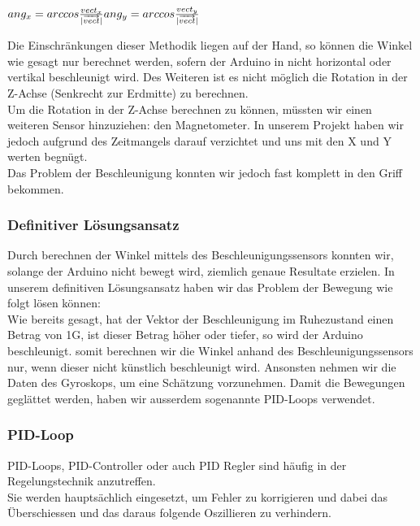 \vspace{5mm}
\begin{math}
ang_x = arccos{\frac{vect_x}{\lvert\overrightarrow{vect}\rvert}}\\
ang_y = arccos{\frac{vect_y}{\lvert\overrightarrow{vect}\rvert}}
\end{math}
\vspace{5mm}

Die Einschränkungen dieser Methodik liegen auf der Hand, so können die Winkel wie gesagt nur berechnet werden, sofern der Arduino in nicht horizontal oder vertikal beschleunigt wird.
Des Weiteren ist es nicht möglich die Rotation in der Z-Achse (Senkrecht zur Erdmitte) zu berechnen.\\
Um die Rotation in der Z-Achse berechnen zu können, müssten wir einen weiteren Sensor hinzuziehen: den Magnetometer. 
In unserem Projekt haben wir jedoch aufgrund des Zeitmangels darauf verzichtet und uns mit den X und Y werten begnügt.\\
Das Problem der Beschleunigung konnten wir jedoch fast komplett in den Griff bekommen.

\subsubsection{Definitiver Lösungsansatz}
Durch berechnen der Winkel mittels des Beschleunigungssensors konnten wir, solange der Arduino nicht bewegt wird, ziemlich genaue Resultate erzielen.
In unserem definitiven Lösungsansatz haben wir das Problem der Bewegung wie folgt lösen können:\\
Wie bereits gesagt, hat der Vektor der Beschleunigung im Ruhezustand einen Betrag von 1G, ist dieser Betrag höher oder tiefer, so wird der Arduino beschleunigt.
somit berechnen wir die Winkel anhand des Beschleunigungssensors nur, wenn dieser nicht künstlich beschleunigt wird.
Ansonsten nehmen wir die Daten des Gyroskops, um eine Schätzung vorzunehmen.
Damit die Bewegungen geglättet werden, haben wir ausserdem sogenannte PID-Loops verwendet.


\subsubsection{PID-Loop}
PID-Loops, PID-Controller oder auch PID Regler sind häufig in der Regelungstechnik anzutreffen.\\
Sie werden hauptsächlich eingesetzt, um Fehler zu korrigieren und dabei das Überschiessen und das daraus folgende Oszillieren zu verhindern.\\

